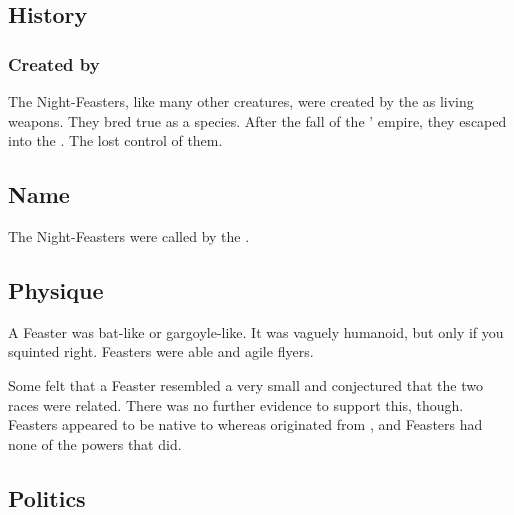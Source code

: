 \subsection{History}





\subsubsection{Created by \ophidians}
The Night-Feasters, like many other creatures, were created by the \ophidians as living weapons. 
They bred true as a species. 
After the fall of the \ophidians' empire, they escaped into the \wylde.
The \ophidians lost control of them. 









\subsection{Name}
The Night-Feasters were called \emph{\feldraxes} by the \ophidians.









\subsection{Physique}
A Feaster was bat-like or gargoyle-like. 
It was vaguely humanoid, but only if you squinted right. 
Feasters were able and agile flyers. 

Some felt that a Feaster resembled a very small \umbra and conjectured that the two races were related. 
There was no further evidence to support this, though.
Feasters appeared to be native to \Miith whereas \umbrae originated from \Erebos, and Feasters had none of the powers that \umbrae did. 









\subsection{Politics}





